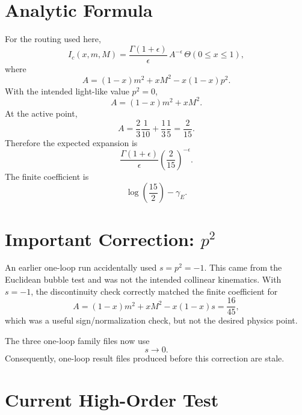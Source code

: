 \documentclass[11pt]{article}
\newcommand{\eps}{\epsilon}
\begin{document}
\section{Analytic Formula}

For the routing used here,
\begin{equation}
  I_c(x,m,M)
  =
  \frac{\Gamma(1+\eps)}{\eps}\,
  A^{-\eps}\,
  \Theta(0\le x\le 1),
\end{equation}
where
\begin{equation}
  A=(1-x)m^2+xM^2-x(1-x)p^2.
\end{equation}
With the intended light-like value \(p^2=0\),
\begin{equation}
  A=(1-x)m^2+xM^2.
\end{equation}
At the active point,
\begin{equation}
  A=\frac23\frac{1}{10}+\frac13\frac15=\frac{2}{15}.
\end{equation}
Therefore the expected expansion is
\begin{equation}
  \frac{\Gamma(1+\eps)}{\eps}
  \left(\frac{2}{15}\right)^{-\eps}.
\end{equation}
The finite coefficient is
\begin{equation}
  \log\!\left(\frac{15}{2}\right)-\gamma_E.
\end{equation}

\section{Important Correction: \(p^2\)}

An earlier one-loop run accidentally used \(s=p^2=-1\). This came from the
Euclidean bubble test and was not the intended collinear kinematics. With
\(s=-1\), the discontinuity check correctly matched the finite coefficient for
\begin{equation}
  A=(1-x)m^2+xM^2-x(1-x)s=\frac{16}{45},
\end{equation}
which was a useful sign/normalization check, but not the desired physics point.

The three one-loop family files now use
\begin{equation}
  s\to 0.
\end{equation}
Consequently, one-loop result files produced before this correction are stale.

\section{Current High-Order Test}
\end{document}
